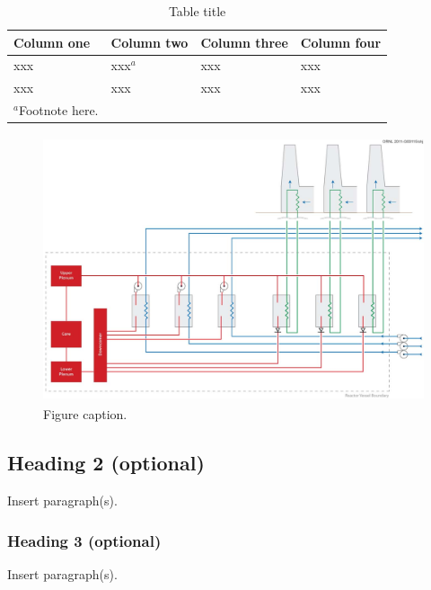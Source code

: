 \documentclass[11pt,letterpaper,english]{article}
\begin{document}
\begin{table}[h]
\centering
\caption{Table title}
\vspace{-.15in}
\label{Tab1}
\begin{tabular}{llll} \\ \hline 
\textbf{Column one} & \textbf{Column two} & \textbf{Column three} & \textbf{Column four} \\ \hline 
 xxx & xxx\textit{${}^{a}$} & xxx & xxx \\ \hline 
xxx & xxx & xxx & xxx \\ \hline 
{\textit{$^{a}$}Footnote here.} \\
\end{tabular}
\end{table}


\begin{figure}[h]
\centering
\includegraphics[width=4.52in, height=3.08in, keepaspectratio=true]{image1.jpg}
\caption{Figure caption.}
\label{Fig1}
\end{figure}

\vspace{-.25in}
\subsection{Heading 2 (optional)}
\vspace{-.2in}

Insert paragraph(s).

\vspace{-.25in}
\subsubsection{Heading 3 (optional)}
\vspace{-.2in}

Insert paragraph(s).
\end{document}
